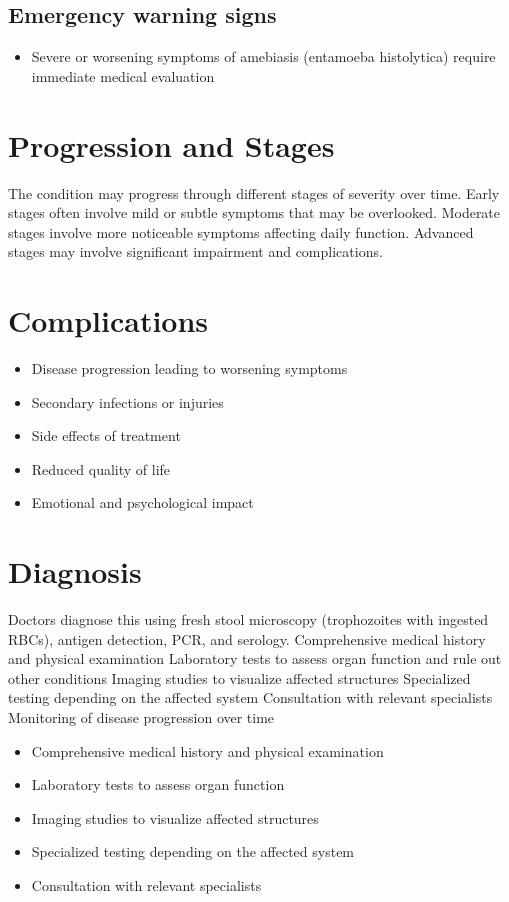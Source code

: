 \subsection{Emergency warning signs}
\begin{itemize}[noitemsep]
  \item Severe or worsening symptoms of amebiasis (entamoeba histolytica) require immediate medical evaluation
\end{itemize}
\section{Progression and Stages}
The condition may progress through different stages of severity over time. Early stages often involve mild or subtle symptoms that may be overlooked. Moderate stages involve more noticeable symptoms affecting daily function. Advanced stages may involve significant impairment and complications.
\section{Complications}
\begin{itemize}[noitemsep]
  \item Disease progression leading to worsening symptoms
  \item Secondary infections or injuries
  \item Side effects of treatment
  \item Reduced quality of life
  \item Emotional and psychological impact
\end{itemize}
\section{Diagnosis}
Doctors diagnose this using fresh stool microscopy (trophozoites with ingested RBCs), antigen detection, PCR, and serology. Comprehensive medical history and physical examination Laboratory tests to assess organ function and rule out other conditions Imaging studies to visualize affected structures Specialized testing depending on the affected system Consultation with relevant specialists Monitoring of disease progression over time

\begin{itemize}[noitemsep]
  \item Comprehensive medical history and physical examination
  \item Laboratory tests to assess organ function
  \item Imaging studies to visualize affected structures
  \item Specialized testing depending on the affected system
  \item Consultation with relevant specialists
\end{itemize}

